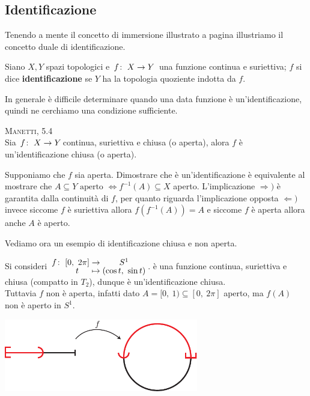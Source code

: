 	\subsection{Identificazione}
Tenendo a mente il concetto di immersione illustrato a pagina \pageref{immersione} illustriamo il concetto duale di identificazione.
\begin{define}
	Siano $X,Y$ spazi topologici e $\funz f X Y$ una funzione continua e suriettiva; $f$ si dice \textbf{identificazione} se $Y$ ha la topologia quoziente indotta da $f$.
\end{define}
In generale è difficile determinare quando una data funzione è un'identificazione, quindi ne cerchiamo una condizione sufficiente. 
\begin{theorema} \textsc{Manetti, 5.4}\\
	Sia $\funz f X Y$continua, suriettiva e chiusa (o aperta), alora $f$ è un'identificazione chiusa (o aperta).
\end{theorema}
\begin{demonstration}
	Supponiamo che $f$ sia aperta. Dimostrare che è un'identificazione è equivalente al mostrare che $\displaystyle A\subseteq Y \text{ aperto } \iff f^{-1}(A)\subseteq X$ aperto. L'implicazione $\Rightarrow)$ è garantita dalla continuità di $f$, per quanto riguarda l'implicazione opposta $\Leftarrow)$ invece siccome $f$ è suriettiva allora $f(f^{-1}(A))=A$ e siccome $f$ è aperta allora anche $A$ è aperto.
\end{demonstration}

Vediamo ora un esempio di identificazione chiusa e non aperta.
\begin{example}
	Si consideri $\displaystyle \funztot f {[0, \ 2\pi]} {S^1} t {(\cos t, \ \sin t)}$. è una funzione continua, suriettiva e chiusa (compatto in $T_2$), dunque è un'identificazione chiusa. \\
	Tuttavia $f$ non è aperta, infatti dato $A=[0, \ 1)\subseteq [0, \ 2\pi]$ aperto, ma $f(A)$ non è aperto in $S^1$.
		\begin{center}
			\includegraphics[width=240pt]{images/half_circle-eps-converted-to}
		\end{center}
\end{example}

